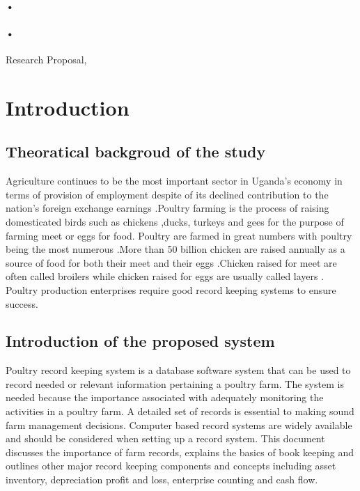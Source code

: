 \documentclass[12pt,]{article}
\begin{document}
\begin{titlepage}
\paragraph*{•}
\paragraph*{•}
  \begin{flushright}
  Research Proposal,\\
 
 \tableofcontents

  \end{flushright}
\date{\today}
\end{titlepage}

\newpage



\section{Introduction}
\subsection{Theoratical backgroud of the study}
Agriculture continues to be the most important sector in Uganda's economy in terms of provision of employment despite of its declined contribution to  the nation's foreign exchange earnings .Poultry farming is the process of raising domesticated birds such as chickens ,ducks, turkeys and gees for the purpose of farming meet or eggs for food. Poultry are farmed in great numbers  with poultry being the  most numerous .More than 50 billion chicken are raised annually as a source of food for both their meet and their eggs .Chicken raised for meet are often called broilers while chicken raised for eggs are usually called  layers . Poultry production enterprises require good record keeping systems to ensure success.


\subsection{Introduction of the proposed system}
Poultry record keeping system is a database software system that can be used to record needed or relevant information pertaining a poultry farm. The system is needed because the importance associated with adequately monitoring the activities in a poultry farm. A detailed set of records is essential to making sound farm management decisions. Computer based record systems are widely available and should be considered when setting up a record system.
This document discusses the importance of farm records, explains the basics of book keeping and outlines other major record keeping components and concepts including asset inventory, depreciation profit and loss, enterprise counting and cash flow. 
\end{document}
